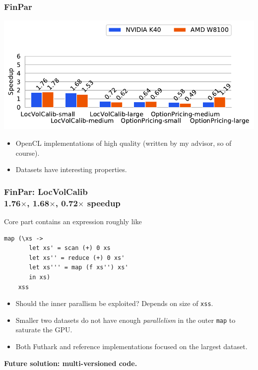 \documentclass[rgb,dvipsnames]{beamer}
\begin{document}
\begin{frame}
  \frametitle{FinPar}

  \begin{center}
    \includegraphics[scale=0.8]{img/finpar.pdf}
  \end{center}


    \begin{itemize}
    \item OpenCL implementations of high quality (written by my
      advisor, so of course).
    \item Datasets have interesting properties.
    \end{itemize}
\end{frame}

\begin{frame}[fragile]
  \frametitle{FinPar: LocVolCalib \\ 1.76$\times$, 1.68$\times$, 0.72$\times$ speedup}

  Core part contains an expression roughly like

\begin{lstlisting}
map (\xs ->
       let xs' = scan (+) 0 xs
       let xs'' = reduce (+) 0 xs'
       let xs''' = map (f xs'') xs'
       in xs)
    xss
\end{lstlisting}

  \begin{itemize}
  \item Should the inner parallism be exploited?  Depends on size of
    \lstinline{xss}.
  \item Smaller two datasets do not have enough \textit{parallelism}
    in the outer \lstinline{map} to saturate the GPU.
  \item Both Futhark and reference implementations focused on the
    largest dataset.
  \end{itemize}

\textbf{Future solution: multi-versioned code.}
\end{frame}
\end{document}
